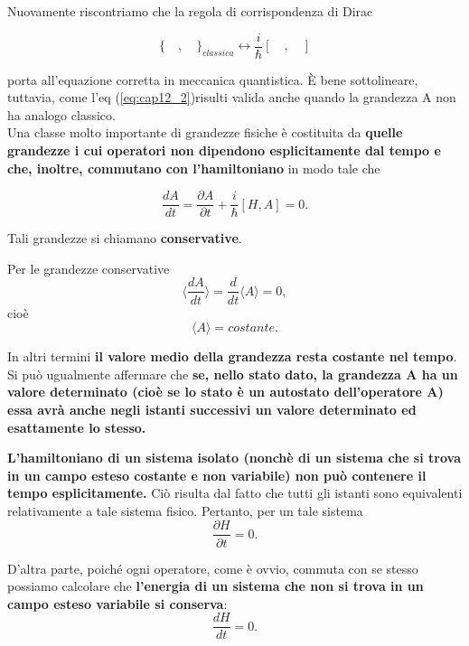 Nuovamente riscontriamo che la regola di corrispondenza di Dirac 

\begin{equation}
\{ \quad,\quad   \}_{classica}  \leftrightarrow \frac{i}{\hbar} [ \quad, \quad]
\end{equation}

porta all'equazione corretta in meccanica quantistica.
È bene sottolineare, tuttavia, come l'eq (\ref{eq:cap12_2})risulti valida anche quando la grandezza A non ha analogo classico.\\
Una classe molto importante di grandezze fisiche è costituita da \textbf{quelle grandezze i cui operatori non dipendono esplicitamente dal tempo e che, inoltre, commutano con l'hamiltoniano} in modo tale che 

\begin{equation}
\frac{dA}{dt}= \frac{\partial A}{\partial{t}} + \frac{i}{\hbar}[H,A]=0.
\end{equation}

Tali grandezze si chiamano \textbf{conservative}.

Per le grandezze conservative 
\begin{equation} 
\langle \frac{dA}{dt}\rangle= \frac{d}{dt}\langle A \rangle =0,
\end{equation}
cioè 
\begin{equation}
\langle A \rangle= costante.
\end{equation}

In altri termini \textbf{il valore medio della grandezza resta costante nel tempo}. Si può ugualmente affermare che \textbf{se, nello stato dato, la grandezza A ha un valore determinato (cioè se lo stato è un autostato dell'operatore A) essa avrà anche negli istanti successivi un valore determinato ed esattamente lo stesso.}

\textbf{L'hamiltoniano di un sistema isolato (nonchè di un sistema che si trova in un campo esteso costante e non variabile) non può contenere il tempo esplicitamente.} Ciò risulta dal fatto che tutti gli istanti sono equivalenti relativamente a tale sistema fisico. Pertanto, per un tale sistema  
\begin{equation}
\frac{\partial H}{\partial{t}}=0.
\end{equation}

D'altra parte, poiché ogni operatore, come è ovvio, commuta con se stesso possiamo calcolare che \textbf{l'energia di un sistema che non si trova in un campo esteso variabile si conserva}:
\begin{equation}
\frac{dH}{dt}=0.
\end{equation}

